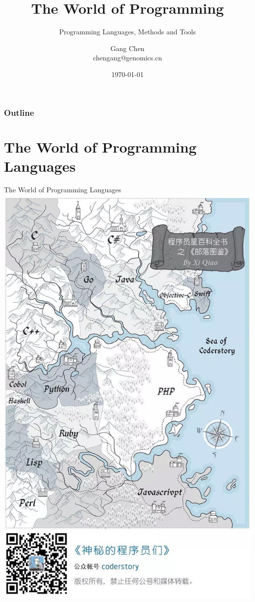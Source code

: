 \documentclass[UTF8]{beamer}
\title{The World of Programming}
\subtitle{Programming Languages, Methods and Tools}
\author{Gang Chen\\ chengang@genomics.cn}
\date{\today}
\begin{document}
\begin{frame}
\titlepage
\end{frame}

\begin{frame}[t]\frametitle{Outline}
\tableofcontents[hideallsubsections]
\end{frame}


\section{The World of Programming Languages}

\begin{frame}[t]{The World of Programming Languages}
    \includegraphics[height=1.1\textheight]{langworld.jpg}
\end{frame}
\end{document}
